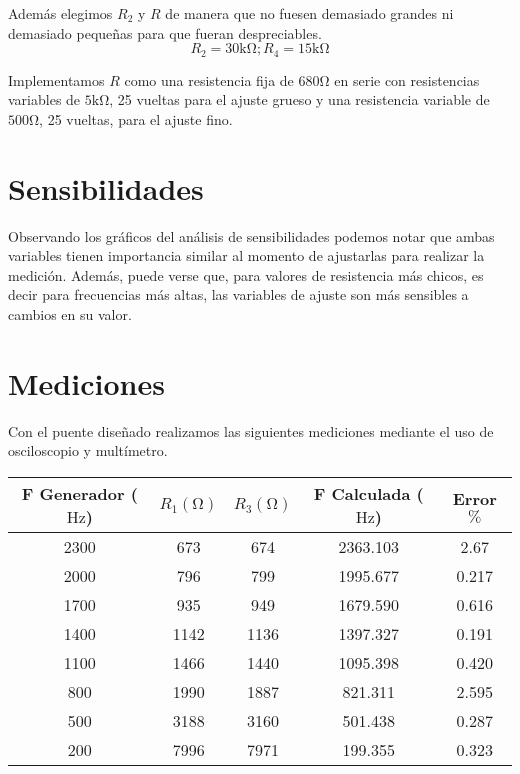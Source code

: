 Además elegimos $R_2$ y $R$ de manera que no fuesen demasiado grandes ni demasiado
pequeñas para que fueran despreciables.
\begin{equation}
    R_2 = 30\si{\kilo\ohm}; R_4=15\si{\kilo\ohm}
\end{equation}

Implementamos $R$ como una resistencia fija de $680\si{\ohm}$ en serie con resistencias
variables de $5\si{\kilo\ohm}$, 25 vueltas para el ajuste grueso y una resistencia variable
de $500\si{\ohm}$, 25 vueltas, para el ajuste fino.

\section{Sensibilidades}

Observando los gráficos del análisis de sensibilidades podemos notar que ambas variables 
tienen importancia similar al momento de ajustarlas para realizar la medición. Además, 
puede verse que, para valores de resistencia más chicos, es decir para frecuencias más altas, 
las variables de ajuste son más sensibles a cambios en su valor.

\section{Mediciones}
Con el puente diseñado realizamos las siguientes mediciones mediante el uso de osciloscopio
y multímetro.

\begin{table}[ht]
    \begin{center}
        \begin{tabular}{|c|c|c|c|c|}
            \toprule
            F Generador ($\si{\hertz}$)& $R_1 (\si{\ohm})$& $R_3 (\si{\ohm})$& F Calculada ($\si{\hertz}$)& Error $\%$ \\
            \midrule
            2300&673&674&2363.103&2.67\\
            2000&796&799&1995.677&0.217\\
            1700&935&949&1679.590&0.616\\
            1400&1142&1136&1397.327&0.191\\
            1100&1466&1440&1095.398&0.420\\
            800&1990&1887&821.311&2.595\\
            500&3188&3160&501.438&0.287\\
            200&7996&7971&199.355&0.323\\
            \bottomrule
        \end{tabular}
    \end{center}
\end{table}

